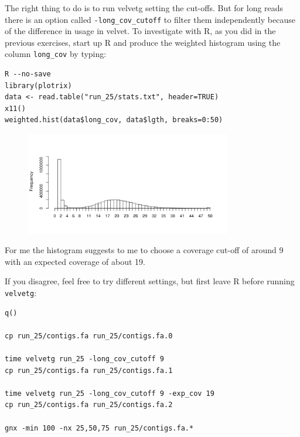 \begin{steps}
The right thing to do is to run velvetg setting the cut-offs. But for long reads
there is an option called \texttt{-long\_cov\_cutoff} to filter them
independently because of the difference in usage in velvet. To investigate with
R, as you did in the previous exercises, start up R and produce the weighted
histogram using the column \texttt{long\_cov} by typing:
\begin{lstlisting}
R --no-save
library(plotrix) 
data <- read.table("run_25/stats.txt", header=TRUE) 
x11() 
weighted.hist(data$long_cov, data$lgth, breaks=0:50)
\end{lstlisting}

\begin{figure}[H]
\centering
\includegraphics[width=0.8\textwidth]{de_novo/velvet/velvet_Rplot003.png}
\label{fig:velvet_Rplot003}
\end{figure}

For me the histogram suggests to me to choose a coverage cut-off of around 9
with an expected coverage of about 19.

If you disagree, feel free to try different settings, but first leave R before
running \texttt{velvetg}:
\begin{lstlisting}
q()

cp run_25/contigs.fa run_25/contigs.fa.0

time velvetg run_25 -long_cov_cutoff 9
cp run_25/contigs.fa run_25/contigs.fa.1

time velvetg run_25 -long_cov_cutoff 9 -exp_cov 19
cp run_25/contigs.fa run_25/contigs.fa.2

gnx -min 100 -nx 25,50,75 run_25/contigs.fa.*
\end{lstlisting}

\end{steps}

